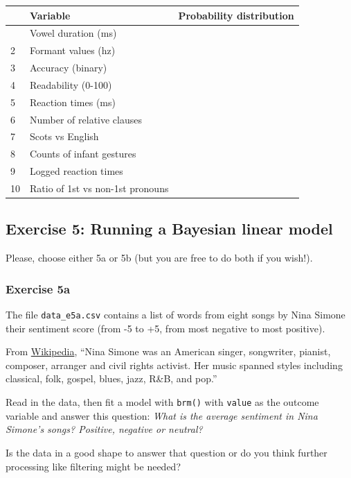 \documentclass[
]{article}
\begin{document}
\begin{longtable}[]{@{}lll@{}}
\toprule\noalign{}
& Variable & Probability distribution \\
\midrule\noalign{}
\endhead
\bottomrule\noalign{}
\endlastfoot
1 & Vowel duration (ms) & \\
2 & Formant values (hz) & \\
3 & Accuracy (binary) & \\
4 & Readability (0-100) & \\
5 & Reaction times (ms) & \\
6 & Number of relative clauses & \\
7 & Scots vs English & \\
8 & Counts of infant gestures & \\
9 & Logged reaction times & \\
10 & Ratio of 1st vs non-1st pronouns & \\
\end{longtable}

\newpage

\subsection{Exercise 5: Running a Bayesian linear
model}\label{exercise-5-running-a-bayesian-linear-model}

Please, choose either 5a or 5b (but you are free to do both if you
wish!).

\subsubsection{Exercise 5a}\label{exercise-5a}

The file \texttt{data\_e5a.csv} contains a list of words from eight
songs by Nina Simone their sentiment score (from -5 to +5, from most
negative to most positive).

From \href{https://en.wikipedia.org/wiki/Nina_Simone}{Wikipedia}, ``Nina
Simone was an American singer, songwriter, pianist, composer, arranger
and civil rights activist. Her music spanned styles including classical,
folk, gospel, blues, jazz, R\&B, and pop.''

Read in the data, then fit a model with \texttt{brm()} with
\texttt{value} as the outcome variable and answer this question:
\emph{What is the average sentiment in Nina Simone's songs? Positive,
negative or neutral?}

Is the data in a good shape to answer that question or do you think
further processing like filtering might be needed?
\end{document}
